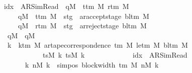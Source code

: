 \begin{isabellebody}
\ \ \ \ \ \ \ \ \ \ \ \ {\isacharparenleft}{\kern0pt}{\isacharparenleft}{\kern0pt}idx\ {\isacharequal}{\kern0pt}\ AR{\isacharunderscore}{\kern0pt}SimRead\ {\isasymand}\ qM{\isacharprime}{\kern0pt}\ {\isasymnotin}\ {\isacharbraceleft}{\kern0pt}t{\isacharunderscore}{\kern0pt}tm\ M{\isacharcomma}{\kern0pt}\ r{\isacharunderscore}{\kern0pt}tm\ M{\isacharbraceright}{\kern0pt}{\isacharparenright}{\kern0pt}\isanewline
\ \ \ \ \ \ \ \ \ \ \ \ \ \ \ {\isasymor}\ {\isacharparenleft}{\kern0pt}qM{\isacharprime}{\kern0pt}\ {\isacharequal}{\kern0pt}\ t{\isacharunderscore}{\kern0pt}tm\ M\ {\isasymand}\ stg\ {\isacharequal}{\kern0pt}\ ar{\isacharunderscore}{\kern0pt}accept{\isacharunderscore}{\kern0pt}stage\ {\isacharparenleft}{\kern0pt}bl{\isacharunderscore}{\kern0pt}tm\ M{\isacharparenright}{\kern0pt}{\isacharparenright}{\kern0pt}\isanewline
\ \ \ \ \ \ \ \ \ \ \ \ \ \ \ {\isasymor}\ {\isacharparenleft}{\kern0pt}qM{\isacharprime}{\kern0pt}\ {\isacharequal}{\kern0pt}\ r{\isacharunderscore}{\kern0pt}tm\ M\ {\isasymand}\ stg\ {\isacharequal}{\kern0pt}\ ar{\isacharunderscore}{\kern0pt}reject{\isacharunderscore}{\kern0pt}stage\ {\isacharparenleft}{\kern0pt}bl{\isacharunderscore}{\kern0pt}tm\ M{\isacharparenright}{\kern0pt}{\isacharparenright}{\kern0pt}{\isacharparenright}{\kern0pt}\isanewline
\ \ \ \ \ \ \ \ \ \ \ \ {\isasymand}\ qM\ {\isacharequal}{\kern0pt}\ qM{\isacharprime}{\kern0pt}\isanewline
\ \ \ \ \ \ \ \ \ \ \ \ {\isasymand}\ {\isacharparenleft}{\kern0pt}{\isasymforall}k\ {\isacharless}{\kern0pt}\ k{\isacharunderscore}{\kern0pt}tm\ M{\isachardot}{\kern0pt}\ ar{\isacharunderscore}{\kern0pt}tape{\isacharunderscore}{\kern0pt}correspondence\ {\isacharparenleft}{\kern0pt}{\isasymGamma}{\isacharunderscore}{\kern0pt}tm\ M{\isacharparenright}{\kern0pt}\ {\isacharparenleft}{\kern0pt}le{\isacharunderscore}{\kern0pt}tm\ M{\isacharparenright}{\kern0pt}\ {\isacharparenleft}{\kern0pt}bl{\isacharunderscore}{\kern0pt}tm\ M{\isacharparenright}{\kern0pt}\isanewline
\ \ \ \ \ \ \ \ \ \ \ \ \ \ \ \ \ \ \ \ \ \ \ {\isacharparenleft}{\kern0pt}tsM\ k{\isacharparenright}{\kern0pt}\ {\isacharparenleft}{\kern0pt}tsM{\isacharprime}{\kern0pt}\ k{\isacharparenright}{\kern0pt}{\isacharparenright}{\kern0pt}\isanewline
\ \ \ \ \ \ \ \ \ \ \ \ {\isasymand}\ {\isacharparenleft}{\kern0pt}idx\ {\isacharequal}{\kern0pt}\ AR{\isacharunderscore}{\kern0pt}SimRead\isanewline
\ \ \ \ \ \ \ \ \ \ \ \ \ \ \ \ \ {\isasymlongrightarrow}\ {\isacharparenleft}{\kern0pt}{\isasymforall}k{\isachardot}{\kern0pt}\ nM{\isacharprime}{\kern0pt}\ k\ {\isacharequal}{\kern0pt}\ sim{\isacharunderscore}{\kern0pt}pos\ {\isacharparenleft}{\kern0pt}block{\isacharunderscore}{\kern0pt}width\ {\isacharparenleft}{\kern0pt}{\isasymGamma}{\isacharunderscore}{\kern0pt}tm\ M{\isacharparenright}{\kern0pt}{\isacharparenright}{\kern0pt}\ {\isacharparenleft}{\kern0pt}nM\ k{\isacharparenright}{\kern0pt}{\isacharparenright}{\kern0pt}{\isacharparenright}{\kern0pt}{\isacharparenright}{\kern0pt}{\isacharparenright}{\kern0pt}{\isacharparenright}{\kern0pt}{\isachardoublequoteclose}%

\end{isabellebody}
